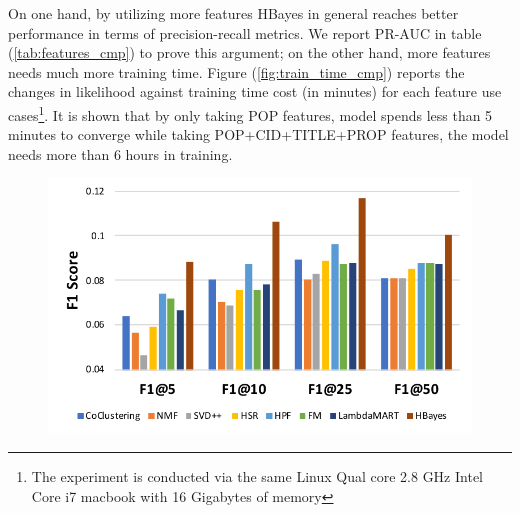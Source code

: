 On one hand, by utilizing more features HBayes in general reaches better performance in terms of precision-recall metrics.  We report PR-AUC in table (\ref{tab:features_cmp}) to prove this argument; on the other hand, more features needs much more training time.  Figure (\ref{fig:train_time_cmp}) reports the changes in likelihood against training time cost (in minutes) for each feature use cases\footnote{The experiment is conducted via the same Linux Qual core 2.8 GHz Intel Core i7 macbook with 16 Gigabytes of memory}. It is shown that by only taking POP features, model spends less than 5 minutes to converge while taking POP+CID+TITLE+PROP features, the model needs more than 6 hours in training.   

\begin{table}[htb]
\centering
{}
\caption{Model performance under different feature combinations in terms of PR AUC}
\label{tab:features_cmp}
\end{table}

\begin{figure}[!htb]
\includegraphics[width=0.7\linewidth]{fig/legend}
\end{figure}

